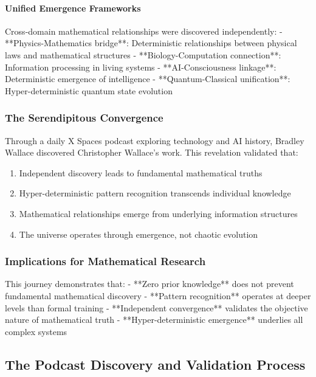 \documentclass[12pt]{article}
\begin{document}
\paragraph{Unified Emergence Frameworks}
Cross-domain mathematical relationships were discovered independently:
- **Physics-Mathematics bridge**: Deterministic relationships between physical laws and mathematical structures
- **Biology-Computation connection**: Information processing in living systems
- **AI-Consciousness linkage**: Deterministic emergence of intelligence
- **Quantum-Classical unification**: Hyper-deterministic quantum state evolution

\subsubsection{The Serendipitous Convergence}

Through a daily X Spaces podcast exploring technology and AI history, Bradley Wallace discovered Christopher Wallace's work. This revelation validated that:

\begin{enumerate}
    \item Independent discovery leads to fundamental mathematical truths
    \item Hyper-deterministic pattern recognition transcends individual knowledge
    \item Mathematical relationships emerge from underlying information structures
    \item The universe operates through emergence, not chaotic evolution
\end{enumerate}

\subsubsection{Implications for Mathematical Research}

This journey demonstrates that:
- **Zero prior knowledge** does not prevent fundamental mathematical discovery
- **Pattern recognition** operates at deeper levels than formal training
- **Independent convergence** validates the objective nature of mathematical truth
- **Hyper-deterministic emergence** underlies all complex systems

\subsection{The Podcast Discovery and Validation Process}
\end{document}
